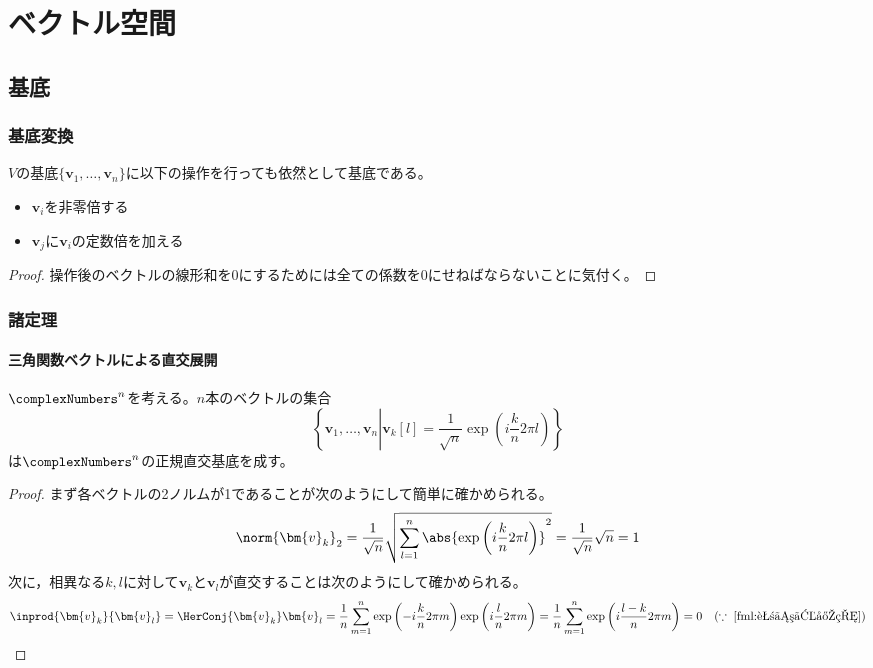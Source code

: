 \chapter{ベクトル空間}
    \section{基底}
        \subsection{基底変換}
            \begin{shadebox}
                $V$の基底$\{\bm{v}_1,\dotsc,\bm{v}_n\}$に以下の操作を行っても依然として基底である。
                \begin{itemize}
                    \item $\bm{v}_i$を非零倍する
                    \item $\bm{v}_j$に$\bm{v}_i$の定数倍を加える
                \end{itemize}
            \end{shadebox}
            \begin{proof}
                \quad\par
                操作後のベクトルの線形和を0にするためには全ての係数を0にせねばならないことに気付く。
            \end{proof}
        \subsection{諸定理}
            \subsubsection{三角関数ベクトルによる直交展開}
                \begin{shadebox}
                    $\complexNumbers^n$を考える。$n$本のベクトルの集合
                    \[\left\{\bm{v}_1,\dotsc,\bm{v}_n \left| \bm{v}_k[l] = \frac{1}{\sqrt{n}}\exp\left(i\frac{k}{n}2\pi l\right) \right. \right\}\]
                    は$\complexNumbers^n$の正規直交基底を成す。
                \end{shadebox}
                \begin{proof}
                    \quad\par
                    まず各ベクトルの2ノルムが1であることが次のようにして簡単に確かめられる。
                    \[\norm{\bm{v}_k}_2 = \frac{1}{\sqrt{n}}\sqrt{\sum_{l=1}^n{\abs{\exp\left(i\frac{k}{n}2\pi l\right)}^2}} = \frac{1}{\sqrt{n}}\sqrt{n} = 1\]
                    次に，相異なる$k,l$に対して$\bm{v}_k$と$\bm{v}_l$が直交することは次のようにして確かめられる。
                    \[\inprod{\bm{v}_k}{\bm{v}_l} = \HerConj{{\bm{v}_k}}\bm{v}_l = \frac{1}{n}\sum_{m=1}^n{\exp\left(-i\frac{k}{n}2\pi m\right)\exp\left(i\frac{l}{n}2\pi m\right)} = \frac{1}{n}\sum_{m=1}^n{\exp\left(i\frac{l-k}{n}2\pi m\right)} = 0\quad(\because\;\ref{fml:花びら定理})\]
                \end{proof}
